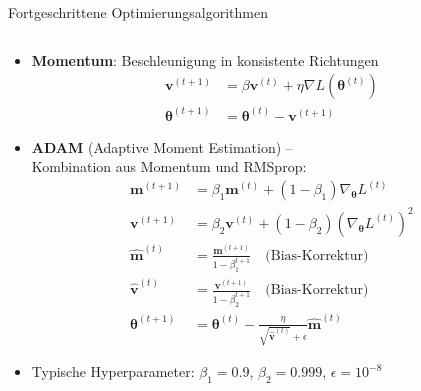 \documentclass[aspectratio=1610, xcolor=dvipsnames, 9pt]{beamer}
\begin{document}
      \begin{frame}{Fortgeschrittene Optimierungsalgorithmen}
        \begin{columns}
          \begin{column}{1\textwidth}
            \begin{itemize}
              \item \textbf{Momentum}: Beschleunigung in konsistente Richtungen
              \begin{align}
                \mathbf{v}^{(t+1)} &= \beta \mathbf{v}^{(t)} + \eta \nabla L(\boldsymbol{\theta}^{(t)}) \\
                \boldsymbol{\theta}^{(t+1)} &= \boldsymbol{\theta}^{(t)} - \mathbf{v}^{(t+1)}
              \end{align}
              \item \textbf{ADAM} \cite{kingma2014adam} (Adaptive Moment Estimation) -- \\
                    Kombination aus Momentum und RMSprop:
              \begin{align}
                \mathbf{m}^{(t+1)} &= \beta_1 \mathbf{m}^{(t)} + (1 - \beta_1) \nabla_{\boldsymbol{\theta}} L^{(t)} \\
                \mathbf{v}^{(t+1)} &= \beta_2 \mathbf{v}^{(t)} + (1 - \beta_2) (\nabla_{\boldsymbol{\theta}} L^{(t)})^2 \\
                \hat{\mathbf{m}}^{(t)} &= \frac{\mathbf{m}^{(t+1)}}{1 - \beta_1^{t+1}} \quad \text{(Bias-Korrektur)} \\
                \hat{\mathbf{v}}^{(t)} &= \frac{\mathbf{v}^{(t+1)}}{1 - \beta_2^{t+1}} \quad \text{(Bias-Korrektur)} \\
                \boldsymbol{\theta}^{(t+1)} &= \boldsymbol{\theta}^{(t)} - \frac{\eta}{\sqrt{\hat{\mathbf{v}}^{(t)}} + \epsilon} \hat{\mathbf{m}}^{(t)}
              \end{align}
              \item Typische Hyperparameter: $\beta_1 = 0.9$, $\beta_2 = 0.999$, $\epsilon = 10^{-8}$
            \end{itemize}
          \end{column}
        \end{columns}
      \end{frame}
\end{document}
